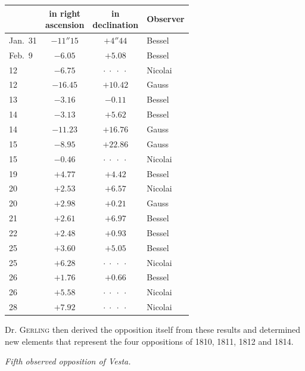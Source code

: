 \begin{center}\fontsize{10}{12}\selectfont\setlength{\tabcolsep}{6pt}\renewcommand{\arraystretch}{1.15}\begin{tabular}{l|c|c|l}
& \shortstack{in right\\ascension} & \shortstack{in\\declination} & Observer \\
\hline
Jan.\ 31 & $-11''15$ & $+4''44$  & Bessel \\
Feb.\ 9 & $-6.05$   & $+5.08$   & Bessel \\
12       & $-6.75$   & $\cdot\;\cdot\;\cdot\;\cdot$ & Nicolai \\
12       & $-16.45$  & $+10.42$  & Gauss \\
13       & $-3.16$   & $-0.11$   & Bessel \\
14       & $-3.13$   & $+5.62$   & Bessel \\
14       & $-11.23$  & $+16.76$  & Gauss \\
15       & $-8.95$   & $+22.86$  & Gauss \\
15       & $-0.46$   & $\cdot\;\cdot\;\cdot\;\cdot$ & Nicolai \\
19       & $+4.77$   & $+4.42$   & Bessel \\
20       & $+2.53$   & $+6.57$   & Nicolai \\
20       & $+2.98$   & $+0.21$   & Gauss \\
21       & $+2.61$   & $+6.97$   & Bessel \\
22       & $+2.48$   & $+0.93$   & Bessel \\
25       & $+3.60$   & $+5.05$   & Bessel \\
25       & $+6.28$   & $\cdot\;\cdot\;\cdot\;\cdot$ & Nicolai \\
26       & $+1.76$   & $+0.66$   & Bessel \\
26       & $+5.58$   & $\cdot\;\cdot\;\cdot\;\cdot$ & Nicolai \\
28       & $+7.92$   & $\cdot\;\cdot\;\cdot\;\cdot$ & Nicolai \\
\end{tabular}\end{center}

\par\indent Dr. \textsc{Gerling} then derived the opposition itself from these results and determined new elements that represent the four oppositions of 1810, 1811, 1812 and 1814.

\emph{Fifth observed opposition of Vesta.}


